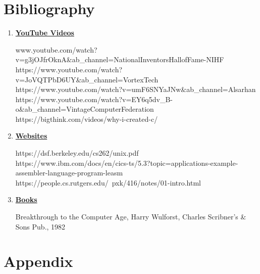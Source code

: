 \documentclass[12pt]{article}
\begin{document}
\newpage

\vspace*{\fill}
\section{Bibliography}

\begin{enumerate}
    \item \textbf{\underline{YouTube Videos}}
    
    \begin{sloppypar}
        \footnotesize
        www.youtube.com/watch?v=g3jOJfrOknA\&ab\_channel=NationalInventorsHallofFame-NIHF \\
        https://www.youtube.com/watch?v=JoVQTPbD6UY\&ab\_channel=VortexTech \\
        https://www.youtube.com/watch?v=umF6SNYaJNw\&ab\_channel=Alsarhan \\
        https://www.youtube.com/watch?v=EY6q5dv\_B-o\&ab\_channel=VintageComputerFederation \\
        https://bigthink.com/videos/why-i-created-c/
    \end{sloppypar}

    \item \textbf{\underline{Websites}}
    \begin{sloppypar}
        \footnotesize
        https://dsf.berkeley.edu/cs262/unix.pdf \\
        https://www.ibm.com/docs/en/cics-ts/5.3?topic=applications-example-assembler-language-program-leasm \\
        https://people.cs.rutgers.edu/~pxk/416/notes/01-intro.html
    \end{sloppypar}

    \item \textbf{\underline{Books}}
    \begin{sloppypar}
        \footnotesize
        Breakthrough to the Computer Age, Harry Wulforst, Charles Scribner’s \& Sons Pub., 1982
    \end{sloppypar}
\end{enumerate}

\vspace*{\fill}

\newpage
\section{Appendix}
\end{document}
